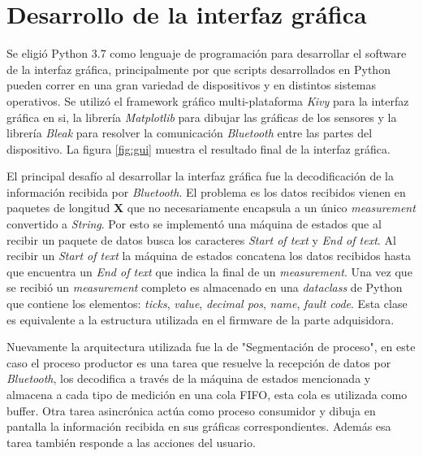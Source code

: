 \section{Desarrollo de la interfaz gráfica}

Se eligió Python 3.7 como lenguaje de programación para desarrollar el software de la interfaz gráfica, principalmente por que scripts desarrollados en Python pueden correr en una gran variedad de dispositivos y en distintos sistemas operativos. Se utilizó el framework gráfico multi-plataforma \textit{Kivy} para la interfaz gráfica en si, la librería \textit{Matplotlib} para dibujar las gráficas de los sensores y la librería \textit{Bleak} para resolver la comunicación \textit{Bluetooth} entre las partes del dispositivo. La figura \ref{fig:gui} muestra el resultado final de la interfaz gráfica.

El principal desafío al desarrollar la interfaz gráfica fue la decodificación de la información recibida por \textit{Bluetooth}. El problema es los datos recibidos vienen en paquetes de longitud \textbf{X} que no necesariamente encapsula a un único \textit{measurement} convertido a \textit{String}. Por esto se implementó una máquina de estados que al recibir un paquete de datos busca los caracteres \textit{Start of text} y \textit{End of text}. Al recibir un \textit{Start of text} la máquina de estados concatena los datos recibidos hasta que encuentra un \textit{End of text} que indica la final de un \textit{measurement}. Una vez que se recibió un \textit{measurement} completo es almacenado en una \textit{dataclass} de Python que contiene los elementos: \textit{ticks}, \textit{value}, \textit{decimal pos}, \textit{name}, \textit{fault code}. Esta clase es equivalente a la estructura utilizada en el firmware de la parte adquisidora.

Nuevamente la arquitectura utilizada fue la de "Segmentación de proceso", en este caso el proceso productor es una tarea que resuelve la recepción de datos por \textit{Bluetooth}, los decodifica a través de la máquina de estados mencionada y almacena a cada tipo de medición en una cola FIFO, esta cola es utilizada como buffer. Otra tarea asincrónica actúa como proceso consumidor y dibuja en pantalla la información recibida en sus gráficas correspondientes. Además esa tarea también responde a las acciones del usuario.

